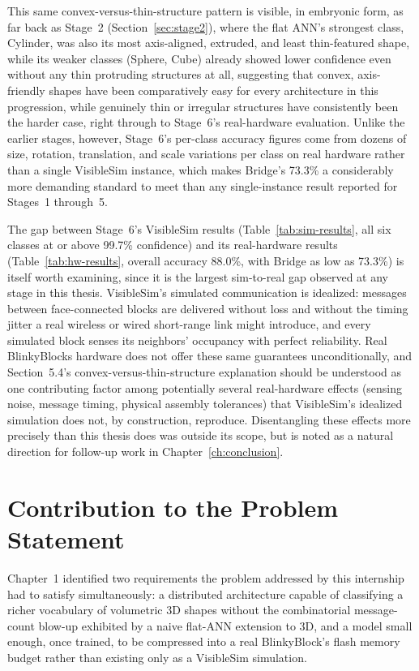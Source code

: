 \documentclass[12pt,a4paper]{report}
\begin{document}
This same convex-versus-thin-structure pattern is visible, in embryonic form, as far back as Stage~2 (Section~\ref{sec:stage2}), where the flat ANN's strongest class, Cylinder, was also its most axis-aligned, extruded, and least thin-featured shape, while its weaker classes (Sphere, Cube) already showed lower confidence even without any thin protruding structures at all, suggesting that convex, axis-friendly shapes have been comparatively easy for every architecture in this progression, while genuinely thin or irregular structures have consistently been the harder case, right through to Stage~6's real-hardware evaluation. Unlike the earlier stages, however, Stage~6's per-class accuracy figures come from dozens of size, rotation, translation, and scale variations per class on real hardware rather than a single VisibleSim instance, which makes Bridge's 73.3\% a considerably more demanding standard to meet than any single-instance result reported for Stages~1 through~5.

The gap between Stage~6's VisibleSim results (Table~\ref{tab:sim-results}, all six classes at or above 99.7\% confidence) and its real-hardware results (Table~\ref{tab:hw-results}, overall accuracy 88.0\%, with Bridge as low as 73.3\%) is itself worth examining, since it is the largest sim-to-real gap observed at any stage in this thesis. VisibleSim's simulated communication is idealized: messages between face-connected blocks are delivered without loss and without the timing jitter a real wireless or wired short-range link might introduce, and every simulated block senses its neighbors' occupancy with perfect reliability. Real BlinkyBlocks hardware does not offer these same guarantees unconditionally, and Section~5.4's convex-versus-thin-structure explanation should be understood as one contributing factor among potentially several real-hardware effects (sensing noise, message timing, physical assembly tolerances) that VisibleSim's idealized simulation does not, by construction, reproduce. Disentangling these effects more precisely than this thesis does was outside its scope, but is noted as a natural direction for follow-up work in Chapter~\ref{ch:conclusion}.

\chapter{Contribution to the Problem Statement}
\label{ch:contribution}

Chapter~1 identified two requirements the problem addressed by this internship had to satisfy simultaneously: a distributed architecture capable of classifying a richer vocabulary of volumetric 3D shapes without the combinatorial message-count blow-up exhibited by a naive flat-ANN extension to 3D, and a model small enough, once trained, to be compressed into a real BlinkyBlock's flash memory budget rather than existing only as a VisibleSim simulation.
\end{document}
